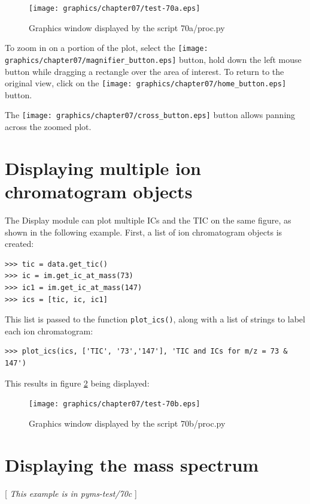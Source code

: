 \begin{figure}
  \begin{center}
    \texttt{[image: graphics/chapter07/test-70a.eps]}
  \end{center}
  \caption{Graphics window displayed by the script 70a/proc.py}
  \label{fig:70a}
\end{figure}

To zoom in on a portion of the plot, select the
\texttt{[image: graphics/chapter07/magnifier\_button.eps]}
button, hold down the left mouse button while dragging a rectangle over
the area of interest. To return to the original view, click on the
\texttt{[image: graphics/chapter07/home\_button.eps]} button.

The 
\texttt{[image: graphics/chapter07/cross\_button.eps]}
button allows panning across the zoomed plot. 

\section{Displaying multiple ion chromatogram objects}


The Display module can plot multiple ICs and the TIC on the same figure,
as shown in the following example. First, a list of ion chromatogram
objects is created:

\begin{verbatim}
>>> tic = data.get_tic()
>>> ic = im.get_ic_at_mass(73)
>>> ic1 = im.get_ic_at_mass(147)
>>> ics = [tic, ic, ic1]
\end{verbatim}

This list is passed to the function {\tt plot\_ics()}, along with a list
of strings to label each ion chromatogram:

\begin{verbatim}
>>> plot_ics(ics, ['TIC', '73','147'], 'TIC and ICs for m/z = 73 & 147')
\end{verbatim}

This results in figure \ref{fig:70b} being displayed:

\begin{figure}
  \begin{center}
    \texttt{[image: graphics/chapter07/test-70b.eps]}
  \end{center}
  \caption{Graphics window displayed by the script 70b/proc.py}
  \label{fig:70b}
\end{figure}

\section{Displaying the mass spectrum}
[ {\em This example is in pyms-test/70c} ]

